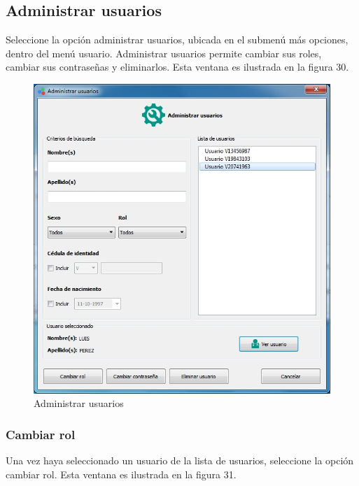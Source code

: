 	\subsection{Administrar usuarios}
	
	Seleccione la opci\'{o}n administrar usuarios, ubicada en el submen\'{u} m\'{a}s opciones, dentro del men\'{u} usuario. Administrar usuarios permite cambiar sus roles, cambiar sus contrase\~{n}as y eliminarlos. Esta ventana es ilustrada en la figura 30.
	
\begin{figure}[H]
  \centering
  \includegraphics[width=1\linewidth]{./img/administrar-usuarios.jpg}
\caption{Administrar usuarios}
\end{figure}
	
		\subsubsection{Cambiar rol}
		
		Una vez haya seleccionado un usuario de la lista de usuarios, seleccione la opci\'{o}n cambiar rol. Esta ventana es ilustrada en la figura 31.
		
